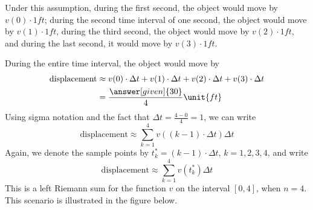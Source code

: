 \documentclass{ximera}
\begin{document}
\begin{example}
\begin{explanation}
Under this assumption, during the first second, the object would move
by $v(0)\cdot1 \unit{ft}$; during the second time interval of one
second, the object would move by $v(1)\cdot1 \unit{ft}$, during the
third second, the object would move by $v(2)\cdot1 \unit{ft}$, and
during the last second, it would move by $v(3)\cdot1 \unit{ft}$.
 
During the entire time interval, the object would move by
\begin{align*}
  \text{displacement} &\approx v(0)\cdot\Delta t+v(1)\cdot\Delta t+v(2)\cdot\Delta t+v(3)\cdot\Delta t\\
  &=\frac{\answer[given]{30}}{4} \unit{ft}
\end{align*}
Using sigma notation and the fact that $\Delta t=\frac{4-0}{4}=1$, we can write
\[
   \text{displacement}\approx \sum_{k=1}^4v((k-1)\cdot\Delta t)\Delta t
  \]
  Again, we denote the  sample points by $t_{k}^*=(k-1)\cdot\Delta t$, $k=1,2,3,4$, and write
  \[
   \text{displacement}\approx \sum_{k=1}^4v(t_{k}^*)\Delta t
  \]
  This is a left Riemann sum for the function $v$ on the interval $[0,4]$, when $n=4$.
This scenario is illustrated in the figure below.
\begin{image}
\end{image}
\end{explanation}
\end{example}
\end{document}
